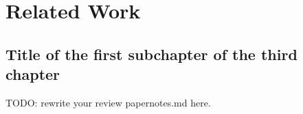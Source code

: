 \chapter{Related Work}

\section{Title of the first subchapter of the third chapter}
TODO: rewrite your review papernotes.md here.

